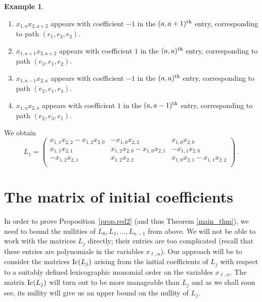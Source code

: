 \documentclass{amsproc}
\theoremstyle{definition}
\newtheorem{example}[theorem]{Example}
\theoremstyle{remark}
\numberwithin{equation}{section}
\newcommand{\Ic}{{\rm Ic}}
\begin{document}
\begin{example}
\begin{enumerate}
\item $x_{1,a}x_{2,a+2}$ appears with coefficient $-1$ in the $(a,a+1)^{\rm th}$ entry, corresponding to path $(e_1,e_3,e_2)$.
\item $x_{1,a+1}x_{2,a+2}$ appears with coefficient $1$ in the $(a,a)^{\rm th}$ entry, corresponding to path $(e_3,e_1,e_2)$.
\item $x_{1,a-1}x_{2,a}$ appears with coefficient $-1$ in the $(a,a)^{\rm th}$ entry, corresponding to path $(e_2,e_1,e_3)$.
\item $x_{1,a}x_{2,a}$ appears with coefficient $1$ in the $(a,a-1)^{\rm th}$ entry, corresponding to path $(e_2,e_3,e_1)$.
\end{enumerate}

We obtain
\[L_1=\left(\begin{array}{ccc}
x_{1,1}x_{2,2}-x_{1,2}x_{2,0} & -x_{1,0}x_{2,2} & x_{1,0}x_{2,0}\\
x_{1,1}x_{2,1} & x_{1,2}x_{2,0}-x_{1,0}x_{2,1} & -x_{1,1}x_{2,0}\\
-x_{1,2}x_{2,1} & x_{1,2}x_{2,2} & x_{1,0}x_{2,1}-x_{1,1}x_{2,2}\\
\end{array}\right)\ .\]
\end{example}




\section{The matrix of initial coefficients}
\label{sect.initial}

In order to prove Proposition~\ref{prop.red2} (and thus Theorem \ref{main_thm}), we need to bound the nullities
of $L_0, L_1, \ldots, L_{n-1}$ from above. We will not be able to work with the matrices $L_j$ directly; their entries 
are too complicated (recall that these entries are polynomials in the variables $x_{\ell, \alpha}$).
Our approach will be to consider the matrices $\Ic(L_j)$ arising from the initial coefficients of $L_j$ 
with respect to a suitably defined lexicographic monomial order on the variables $x_{\ell,\alpha}$. 
The matrix $\Ic(L_j)$ will turn out to be more manageable than $L_j$ and as we shall soon see, its nullity will give us 
an upper bound on the nullity of $L_j$.
\end{document}
